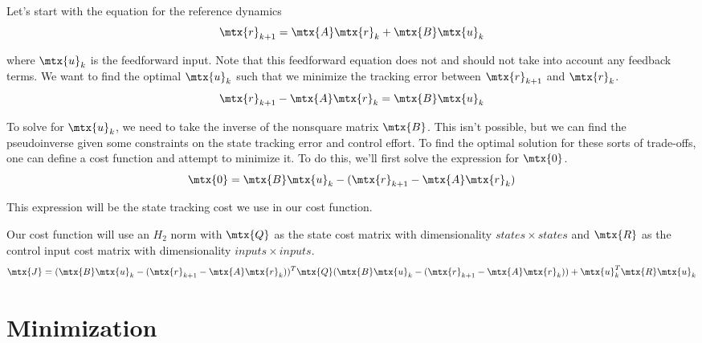 Let's start with the equation for the \gls{reference} dynamics
\begin{equation*}
  \mtx{r}_{k+1} = \mtx{A}\mtx{r}_k + \mtx{B}\mtx{u}_k
\end{equation*}

where $\mtx{u}_k$ is the feedforward input. Note that this feedforward equation
does not and should not take into account any feedback terms. We want to find
the optimal $\mtx{u}_k$ such that we minimize the \gls{tracking} error between
$\mtx{r}_{k+1}$ and $\mtx{r}_k$.
\begin{equation*}
  \mtx{r}_{k+1} - \mtx{A}\mtx{r}_k = \mtx{B}\mtx{u}_k
\end{equation*}

To solve for $\mtx{u}_k$, we need to take the inverse of the nonsquare matrix
$\mtx{B}$. This isn't possible, but we can find the pseudoinverse given some
constraints on the \gls{state} \gls{tracking} error and \gls{control effort}. To
find the optimal solution for these sorts of trade-offs, one can define a cost
function and attempt to minimize it. To do this, we'll first solve the
expression for $\mtx{0}$.
\begin{equation*}
  \mtx{0} = \mtx{B}\mtx{u}_k - (\mtx{r}_{k+1} - \mtx{A}\mtx{r}_k)
\end{equation*}

This expression will be the \gls{state} \gls{tracking} cost we use in our cost
function.

Our cost function will use an $H_2$ norm with $\mtx{Q}$ as the \gls{state} cost
matrix with dimensionality $states \times states$ and $\mtx{R}$ as the
\gls{control input} cost matrix with dimensionality $inputs \times inputs$.
\begin{equation*}
  \mtx{J} = (\mtx{B}\mtx{u}_k - (\mtx{r}_{k+1} - \mtx{A}\mtx{r}_k))^T \mtx{Q}
    (\mtx{B}\mtx{u}_k - (\mtx{r}_{k+1} - \mtx{A}\mtx{r}_k)) +
    \mtx{u}_k^T\mtx{R}\mtx{u}_k
\end{equation*}

\section{Minimization}

